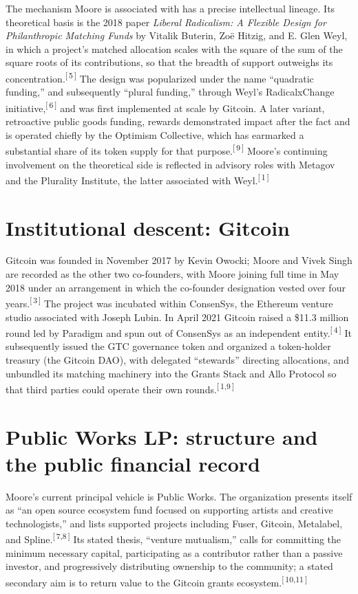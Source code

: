 \documentclass[11pt,letterpaper]{article}
\newcommand{\refn}[1]{\textsuperscript{[\,#1\,]}}
\begin{document}
The mechanism Moore is associated with has a precise intellectual lineage.
Its theoretical basis is the 2018 paper \textit{Liberal Radicalism: A
Flexible Design for Philanthropic Matching Funds} by Vitalik Buterin, Zoë
Hitzig, and E. Glen Weyl, in which a project's matched allocation scales with
the square of the sum of the square roots of its contributions, so that the
breadth of support outweighs its concentration.\refn{5} The design was
popularized under the name ``quadratic funding,'' and subsequently
``plural funding,'' through Weyl's RadicalxChange initiative,\refn{6} and was
first implemented at scale by Gitcoin. A later variant, retroactive public
goods funding, rewards demonstrated impact after the fact and is operated
chiefly by the Optimism Collective, which has earmarked a substantial share
of its token supply for that purpose.\refn{9} Moore's continuing involvement
on the theoretical side is reflected in advisory roles with Metagov and the
Plurality Institute, the latter associated with Weyl.\refn{1}

\section{Institutional descent: Gitcoin}

Gitcoin was founded in November 2017 by Kevin Owocki; Moore and Vivek Singh
are recorded as the other two co-founders, with Moore joining full time in
May 2018 under an arrangement in which the co-founder designation vested over
four years.\refn{3} The project was incubated within ConsenSys, the Ethereum
venture studio associated with Joseph Lubin. In April 2021 Gitcoin raised a
\$11.3 million round led by Paradigm and spun out of ConsenSys as an
independent entity.\refn{4} It subsequently issued the GTC governance token
and organized a token-holder treasury (the Gitcoin DAO), with delegated
``stewards'' directing allocations, and unbundled its matching machinery into
the Grants Stack and Allo Protocol so that third parties could operate their
own rounds.\refn{1,9}

\section{Public Works LP: structure and the public financial record}

Moore's current principal vehicle is Public Works. The organization presents
itself as ``an open source ecosystem fund focused on supporting artists and
creative technologists,'' and lists supported projects including Fuser,
Gitcoin, Metalabel, and Spline.\refn{7,8} Its stated thesis, ``venture
mutualism,'' calls for committing the minimum necessary capital, participating
as a contributor rather than a passive investor, and progressively
distributing ownership to the community; a stated secondary aim is to return
value to the Gitcoin grants ecosystem.\refn{10,11}
\end{document}

